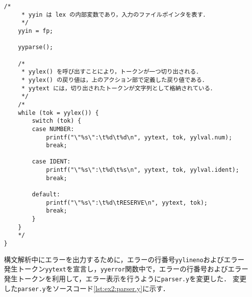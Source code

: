 \documentclass[uplatex]{jsarticle}
\begin{document}
\begin{lstlisting}[caption=scanner.lの修正,label=lst:ex2:scanner.l]
    /*
     * yyin は lex の内部変数であり，入力のファイルポインタを表す．
     */
    yyin = fp;

    yyparse();

    /*
     * yylex() を呼び出すことにより，トークンが一つ切り出される．
     * yylex() の戻り値は，上のアクション部で定義した戻り値である．
     * yytext には，切り出されたトークンが文字列として格納されている．
     */
    /*
    while (tok = yylex()) {
        switch (tok) {
        case NUMBER:
            printf("\"%s\":\t%d\t%d\n", yytext, tok, yylval.num);
            break;

        case IDENT:
            printf("\"%s\":\t%d\t%s\n", yytext, tok, yylval.ident);
            break;

        default:
            printf("\"%s\":\t%d\tRESERVE\n", yytext, tok);
            break;
        }
    }
    */
}

\end{lstlisting}

構文解析中にエラーを出力するために，エラーの行番号\verb#yylineno#およびエラー発生トークン\verb#yytext#を宣言し，\verb#yyerror#関数中で，エラーの行番号およびエラー発生トークンを利用して，エラー表示を行うように\verb#parser.y#を変更した．
変更した\verb#parser.y#をソースコード\ref{lst:ex2:parser.y}に示す．
\end{document}
